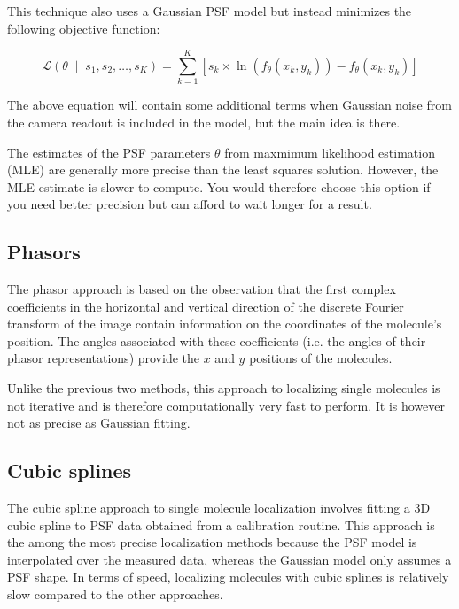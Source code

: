 \documentclass[10pt,a4paper,oneside]{book}
\newcommand{\given}{\;\middle|\;}
\begin{document}
This technique also uses a Gaussian PSF model but instead minimizes the following objective function:

\begin{equation}
    \mathcal{L} \left(\theta \given s_1, s_2, \ldots, s_K \right) = \sum_{k=1}^K \left[ s_k \times \ln \left( f_{\theta} \left( x_k, y_k \right) \right) - f_{\theta} \left( x_k, y_k \right) \right]
\end{equation}

\noindent The above equation will contain some additional terms when Gaussian noise from the camera readout is included in the model, but the main idea is there.

The estimates of the PSF parameters $\theta$ from maxmimum likelihood estimation (MLE) are generally more precise than the least squares solution. However, the MLE estimate is slower to compute. You would therefore choose this option if you need better precision but can afford to wait longer for a result.

\subsection{Phasors}

The phasor approach is based on the observation that the first complex coefficients in the horizontal and vertical direction of the discrete Fourier transform of the image contain information on the coordinates of the molecule's position. The angles associated with these coefficients (i.e. the angles of their phasor representations) provide the $x$ and $y$ positions of the molecules.

Unlike the previous two methods, this approach to localizing single molecules is not iterative and is therefore computationally very fast to perform. It is however not as precise as Gaussian fitting.

\subsection{Cubic splines}

The cubic spline approach to single molecule localization involves fitting a 3D cubic spline to PSF data obtained from a calibration routine. This approach is the among the most precise localization methods because the PSF model is interpolated over the measured data, whereas the Gaussian model only assumes a PSF shape. In terms of speed, localizing molecules with cubic splines is relatively slow compared to the other approaches.
\end{document}
